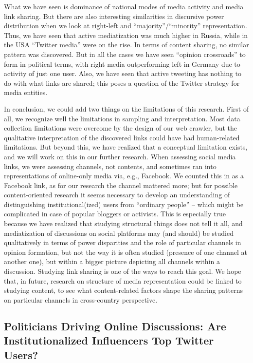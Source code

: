 What we have seen is dominance of national modes of media activity and media link sharing. But there are also interesting similarities in discursive power distribution when we look at right-left and “majority”/“minority” representation. Thus, we have seen that active mediatization was much higher in Russia, while in the USA “Twitter media” were on the rise. In terms of content sharing, no similar pattern was discovered. But in all the cases we have seen “opinion crossroads” to form in political terms, with right media outperforming left in Germany due to activity of just one user. Also, we have seen that active tweeting has nothing to do with what links are shared; this poses a question of the Twitter strategy for media entities.

In conclusion, we could add two things on the limitations of this research. First of all, we recognize well the limitations in sampling and interpretation. Most data collection limitations were overcome by the design of our web crawler, but the qualitative interpretation of the discovered links could have had human-related limitations. But beyond this, we have realized that a conceptual limitation exists, and we will work on this in our further research. When assessing social media links, we were assessing channels, not contents, and sometimes ran into representations of online-only media via, e.g., Facebook. We counted this in as a Facebook link, as for our research the channel mattered more; but for possible content-oriented research it seems necessary to develop an understanding of distinguishing institutional(ized) users from “ordinary people” -- which might be complicated in case of popular bloggers or activists. This is especially true because we have realized that studying structural things does not tell it all, and mediatization of discussions on social platforms may (and should) be studied qualitatively in terms of power disparities and the role of particular channels in opinion formation, but not the way it is often studied (presence of one channel at another one), but within a bigger picture depicting all channels within a discussion. Studying link sharing is one of the ways to reach this goal. We hope that, in future, research on structure of media representation could be linked to studying content, to see what content-related factors shape the sharing patterns on particular channels in cross-country perspective.

\subsection{Politicians Driving Online Discussions: Are Institutionalized Influencers Top Twitter Users?}\label{subsec:ch2/sec5/sub5}

